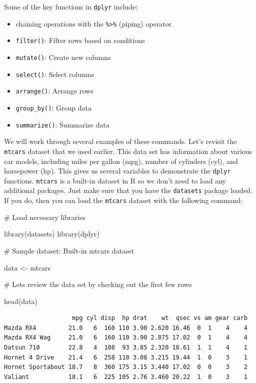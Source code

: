 \documentclass[
  letterpaper,
  DIV=11,
  numbers=noendperiod]{scrreprt}
\newenvironment{Shaded}{\begin{snugshade}}{\end{snugshade}}
\newcommand{\CommentTok}[1]{\textcolor[rgb]{0.37,0.37,0.37}{#1}}
\newcommand{\FunctionTok}[1]{\textcolor[rgb]{0.28,0.35,0.67}{#1}}
\newcommand{\NormalTok}[1]{\textcolor[rgb]{0.00,0.23,0.31}{#1}}
\newcommand{\OtherTok}[1]{\textcolor[rgb]{0.00,0.23,0.31}{#1}}
\providecommand{\tightlist}{%
  \setlength{\itemsep}{0pt}\setlength{\parskip}{0pt}}\usepackage{longtable,booktabs,array}
\begin{document}
Some of the key functions in \texttt{dplyr} include:

\begin{itemize}
\tightlist
\item
  chaining operations with the \texttt{\%\textgreater{}\%} (piping)
  operator
\item
  \texttt{filter()}: Filter rows based on conditions
\item
  \texttt{mutate()}: Create new columns
\item
  \texttt{select()}: Select columns
\item
  \texttt{arrange()}: Arrange rows
\item
  \texttt{group\_by()}: Group data
\item
  \texttt{summarize()}: Summarize data
\end{itemize}

We will work through several examples of these commands. Let's revisit
the \texttt{mtcars} dataset that we used earlier. This data set has
information about various car models, including miles per gallon (mpg),
number of cylinders (cyl), and horsepower (hp). This gives us several
variables to demonstrate the \texttt{dplyr} functions. \texttt{mtcars}
is a built-in dataset in R so we don't need to load any additional
packages. Just make sure that you have the \texttt{datasets} package
loaded. If you do, then you can load the \texttt{mtcars} dataset with
the following command:

\begin{Shaded}
\begin{Highlighting}[]
\CommentTok{\# Load necessary libraries}

\FunctionTok{library}\NormalTok{(datasets)}
\FunctionTok{library}\NormalTok{(dplyr)}

\CommentTok{\# Sample dataset: Built{-}in mtcars dataset}

\NormalTok{data }\OtherTok{\textless{}{-}}\NormalTok{ mtcars}

\CommentTok{\# Let\textquotesingle{}s review the data set by checking out the first few rows}

\FunctionTok{head}\NormalTok{(data)}
\end{Highlighting}
\end{Shaded}

\begin{verbatim}
                   mpg cyl disp  hp drat    wt  qsec vs am gear carb
Mazda RX4         21.0   6  160 110 3.90 2.620 16.46  0  1    4    4
Mazda RX4 Wag     21.0   6  160 110 3.90 2.875 17.02  0  1    4    4
Datsun 710        22.8   4  108  93 3.85 2.320 18.61  1  1    4    1
Hornet 4 Drive    21.4   6  258 110 3.08 3.215 19.44  1  0    3    1
Hornet Sportabout 18.7   8  360 175 3.15 3.440 17.02  0  0    3    2
Valiant           18.1   6  225 105 2.76 3.460 20.22  1  0    3    1
\end{verbatim}
\end{document}
